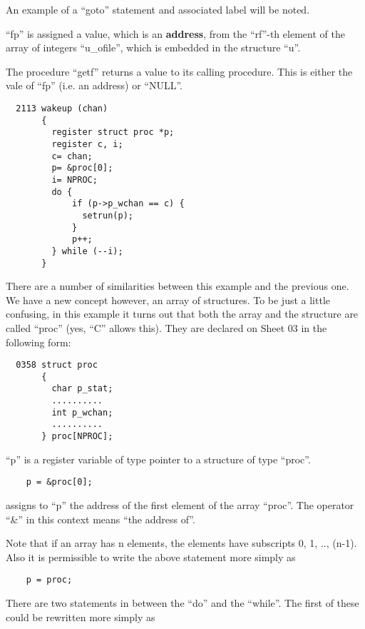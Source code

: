 An example of a ``goto'' statement and
associated label will be noted.


``fp'' is assigned a value, which is an
{\bf address}, from the ``rf''-th element of
the array of integers ``u\_ofile'', which
is embedded in the structure ``u''.


The procedure ``getf'' returns a value to
its calling procedure. This is either
the vale of ``fp'' (i.e. an address) or
``NULL''.


\begin{verbatim}
  2113 wakeup (chan)
       {
         register struct proc *p;
         register c, i;
         c= chan;
         p= &proc[0];
         i= NPROC;
         do {
             if (p->p_wchan == c) {
               setrun(p);
             }
             p++;
         } while (--i);
       }
\end{verbatim}

There are a number of similarities
between this example and the previous
one. We have a new concept however, an
array of structures. To be just a
little confusing, in this example it
turns out that both the array and the
structure are called ``proc'' (yes, ``C''
allows this). They are declared on
Sheet 03 in the following form:

\begin{verbatim}
  0358 struct proc
       {
         char p_stat;
         ..........
         int p_wchan;
         ..........
       } proc[NPROC];
\end{verbatim}

``p'' is a register variable of type
pointer to a structure of type ``proc''.

\begin{verbatim}
    p = &proc[0];
\end{verbatim}


\noindent assigns to ``p'' the address of the first
element of the array ``proc''. The
operator ``\&'' in this context means ``the
address of''.


Note that if an array has n elements,
the elements have subscripts 0, 1, .., (n-1).
Also it is permissible to write
the above statement more simply as

\begin{verbatim}
    p = proc;
\end{verbatim}

There are two statements in between the
``do'' and the ``while''.
The first of these could be rewritten
more simply as

